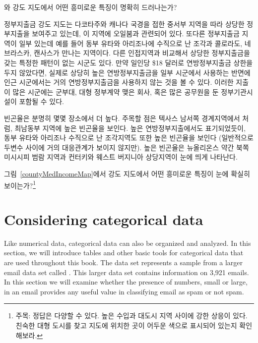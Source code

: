 \begin{example}{ 와  강도 지도에서 어떤 흥미로운 특징이 명확히 드러나는가?}

정부지출금 강도 지도는 다코타주와 캐나다 국경을 접한 중서부 지역을 따라 상당한 정부지출을 보여주고 있는데, 이 지역에 오일붐과 관련되어 있다. 또다른 정부지출금 지역이 일부 있는데 예를 들어 동부 유타와 아리조나에 수직으로 난 조각과 콜로라도, 네브라스카, 캔사스가 만나는 지역이다. 다른 인접지역과 비교해서 상당한 정부지출금을 갖는 특정한 패턴이 없는 시군도 있다. 만약 일인당 \$18 달러로 연방정부지출금 상한을 두지 않았다면, 실제로 상당히 높은 연방정부지출금을 일부 시군에서 사용하는 반면에 인근 시군에서는 거의 연방정부지출금을 사용하지 않는 것을 볼 수 있다.
이러한 지출이 많은 시군에는 군부대, 대형 정부계약 맺은 회사, 혹은 많은 공무원을 둔 정부기관시설이 포함될 수 있다.

빈곤율은 분명히 몇몇 장소에서 더 높다. 주목할 점은 텍사스 남서쪽 경계지역에서 처럼, 최남동부 지역에 높은 빈곤율을 보인다.
높은 연방정부지출에서도 표기되었듯이, 동부 유타와 아리조나 수직으로 난 조각지역도 또한 높은 빈곤율을 보인다 (일반적으로 두변수 사이에 거의 대응관계가 보이지 않지만). 높은 빈곤율은 뉴올리온스 약간 북쪽 미시시피 범람 지역과 컨터키와 웨스트 버지니아 상당지역이 눈에 띄게 나타난다.
\end{example}

\begin{exercise}
그림~\ref{countyMedIncomeMap}에서  강도 지도에서 어떤 흥미로운 특징이 눈에 확실히 보이는가?\footnote{주목: 정답은 다양할 수 있다. 높은 수입과 대도시 지역 사이에 강한 상응이 있다.
친숙한 대형 도시를 찾고 지도에 위치한 곳이 어두운 색으로 표시되어 있는지 확인해보라.}
\end{exercise}




\textC{\newpage}

\section[Considering categorical data]{Considering categorical data }
\label{categoricalData}


Like numerical data, categorical data can also be organized and analyzed. In this section, we will introduce tables and other basic tools for categorical data that are used throughout this book. The  data set represents a sample from a larger email data set called . This larger data set contains information on 3,921 emails. In this section we will examine whether the presence of numbers, small or large, in an email provides any useful value in classifying email as spam or not spam.


